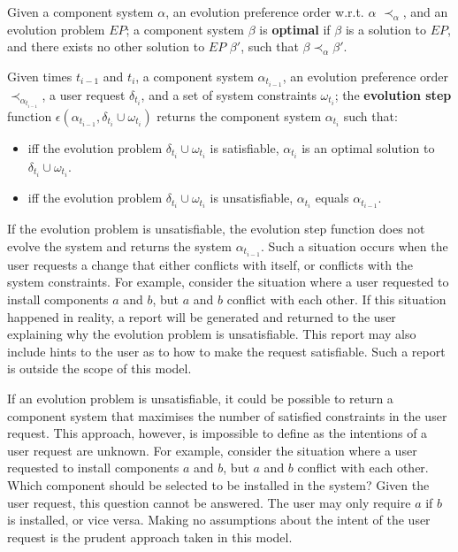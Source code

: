 \begin{defs}
Given a component system $\alpha$, an evolution preference order w.r.t. $\alpha$ $\prec_{\alpha}$, and an evolution problem $EP$;
a component system $\beta$ is \textbf{optimal} if $\beta$ is a solution to $EP$, and there exists no other solution to $EP$ $\beta'$, such that $\beta \prec_{\alpha} \beta'$.   
\end{defs}

\begin{defs}
\label{formal.stepdef}
Given times $t_{i-1}$ and $t_i$, a component system $\alpha_{t_{i-1}}$, an evolution preference order $\prec_{\alpha_{t_{i-1}}}$, 
a user request $\delta_{t_i}$, and a set of system constraints $\omega_{t_i}$;
the \textbf{evolution step} function  $\epsilon(\alpha_{t_{i-1}},\delta_{t_i} \cup \omega_{t_i})$ returns the component system $\alpha_{t_i}$ such that:
\begin{itemize}
  \item iff the evolution problem $\delta_{t_i} \cup \omega_{t_i}$ is satisfiable, $\alpha_{t_i}$ is an optimal solution to $\delta_{t_i} \cup \omega_{t_i}$.
  \item iff the evolution problem $\delta_{t_i} \cup \omega_{t_i}$ is unsatisfiable, $\alpha_{t_i}$ equals $\alpha_{t_{i-1}}$.
\end{itemize}
\end{defs}
If the evolution problem is unsatisfiable, the evolution step function does not evolve the system and returns the system $\alpha_{t_{i-1}}$.
Such a situation occurs when the user requests a change that either conflicts with itself, or conflicts with the system constraints.
For example, consider the situation where a user requested to install components $a$ and $b$, but $a$ and $b$ conflict with each other.
If this situation happened in reality, a report will be generated and returned to the user explaining why the evolution problem is unsatisfiable.
This report may also include hints to the user as to how to make the request satisfiable.
Such a report is outside the scope of this model.

If an evolution problem is unsatisfiable, it could be possible to return a component system that maximises the number of satisfied constraints in the user request.
This approach, however, is impossible to define as the intentions of a user request are unknown.
For example, consider the situation where a user requested to install components $a$ and $b$, but $a$ and $b$ conflict with each other.
Which component should be selected to be installed in the system?
Given the user request, this question cannot be answered.
The user may only require $a$ if $b$ is installed, or vice versa.
Making no assumptions about the intent of the user request is the prudent approach taken in this model.


